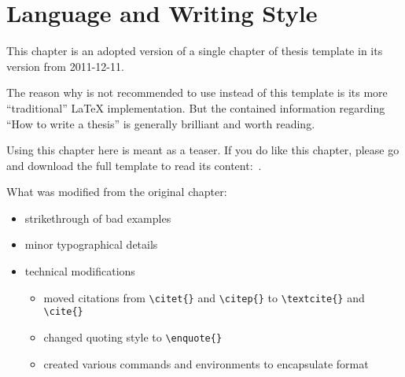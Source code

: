 %
%
% 
% 
% 

\newenvironment{mykeithtabbing}[1]{%
\begin{tabular}{lp{0.9\hsize}}
}{%
\end{tabular}
}

\newcommand{\mybadgood}[2]{%
\begin{mykeithtabbing}
{}\emph{Bad:}  & \sout{#1}  \\
\emph{Good:}   & #2  \\
\end{mykeithtabbing}

}

\chapter{Language and Writing Style}
\label{chap:Style}

\begin{framed}

  This chapter is an adopted version of a single chapter of
  \citeauthor{KeithThesis} thesis template \cite{KeithThesis} in its
  version from 2011-12-11.

  The reason why \cite{KeithThesis} is not recommended to use instead
  of this template is its more \enquote{traditional} \LaTeX{}
  implementation. But the contained information regarding \enquote{How
    to write a thesis} is generally brilliant and worth reading.

  Using this chapter here is meant as a teaser. If you do like this
  chapter, please go and download the full template to read its
  content:~\cite{KeithThesis}.

  What was modified from the original chapter:
    \begin{itemize}
    \item strikethrough of bad examples
    \item minor typographical details
    \item technical modifications
      \begin{itemize}
      \item moved citations from \verb+\citet{}+ and
        \verb+\citep{}+ to \verb+\textcite{}+ and \verb+\cite{}+
      \item changed quoting style to \verb+\enquote{}+
      \item created various commands and environments to encapsulate
        format
      \end{itemize}
    \end{itemize}
\end{framed}

